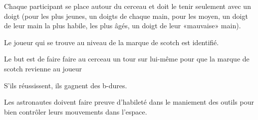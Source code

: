 \documentclass{grand-jeu}
\begin{document}
\begin{liste-materiel}
\end{liste-materiel}

\begin{regles}
Chaque participant se place autour du cerceau et doit le tenir seulement avec un doigt (pour les plus jeunes, un doigts de chaque main, pour les moyen, un doigt de leur main la plus habile, les plus âgés, un doigt de leur «mauvaise» main). 

Le joueur qui se trouve au niveau de la marque de scotch est identifié. 

Le but est de faire faire au cerceau un tour sur lui-même pour que la marque de scotch revienne au joueur

S'ils réussissent, ils gagnent des b-dures.
\end{regles}

\begin{imaginaire}
Les astronautes doivent faire preuve d'habileté dans le maniement des outils pour bien contrôler leurs mouvements dans l'espace. 
\end{imaginaire}

\begin{moments-stop}
\end{moments-stop}
\end{document}
